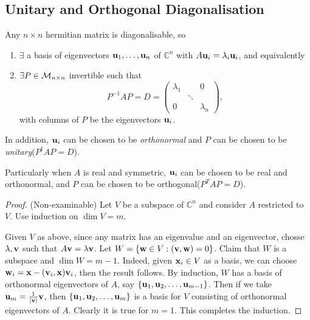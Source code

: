 \documentclass[10pt]{article}
\begin{document}
    \subsection{Unitary and Orthogonal Diagonalisation}
    \begin{theorem}\label{thm:all hermitians are diag}
        Any $n\times n$ hermitian matrix is diagonalisable, so 
        \begin{enumerate}
            \item $ \exists $ a basis of eigenvectors $ {\bf u}_1,\dots,{\bf u}_n $ of $ \mathbb{C}^{n} $ with $ A{\bf u}_i=\lambda_i{\bf u}_i $, and equivalently 
            \item $ \exists P\in {\mathcal{M}}_{n\times n} $ invertible such that 
            \[
                P^{-1}AP=D=\begin{pmatrix}
                    \lambda_1&&0\\
                    &\ddots&\\
                    0&&\lambda_n
                \end{pmatrix},
            \]
            with columns of $P$ be the eigenvectors ${\bf u}_i$.
        \end{enumerate}
        In addition, ${\bf u}_i$ can be chosen to be \textit{orthonormal} and $P$ can be chosen to be \textit{unitary}($ P^\dagger AP=D $).

        Particularly when $A$ is real and symmetric, $ {\bf u}_i $ can be chosen to be real and orthonormal, and $P$ can be chosen to be orthogonal($ P^TAP=D $).
    \end{theorem}
    \begin{proof}(Non-examinable)
        Let $V$ be a subspace of $ \mathbb{C}^{n} $ and consider $A$ restricted to $V$. Use induction on $\dim V=m$.

        Given $V$ as above, since any matrix has an eigenvalue and an eigenvector, chosse $ \lambda,{\bf v} $ such that $ A{\bf v}=\lambda{\bf v} $. Let $ W = \{{\bf w}\in V: ({\bf v},{\bf w})=0\} $. Claim that $W$ is a subspace and $\dim W=m-1$. Indeed, given $ {\bf x}_i\in V $ as a basis, we can choose $ {\bf w}_i={\bf x}-({\bf v}_i,{\bf x}){\bf v}_i $, then the result follows. By induction, $W$ has a basis of orthonormal eigenvectors of $A$, say $ \{{\bf u}_1,{\bf u}_2,\dots,{\bf u}_{m-1}\} $. Then if we take $ {\bf u}_m = \frac{1}{|{\bf v}|}{\bf v} $, then $\{{\bf u}_1,{\bf u}_2,\dots,{\bf u}_{m}\}$ is a basis for $V$ consisting of orthonormal eigenvectors of $A$. Clearly it is true for $m=1$. This completes the induction.
    \end{proof}
\end{document}
